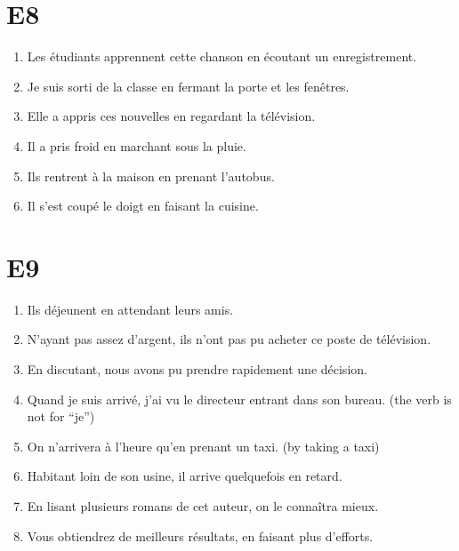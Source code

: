 \documentclass{book}
\begin{document}
    \section{E8}
        \begin{enumerate}
            \item Les étudiants apprennent cette chanson en écoutant un enregistrement.
            \item Je suis sorti de la classe en fermant la porte et les fenêtres.
            \item Elle a appris ces nouvelles en regardant la télévision.
            \item Il a pris froid en marchant sous la pluie.
            \item Ils rentrent à la maison en prenant l'autobus.
            \item Il s'est coupé le doigt en faisant la cuisine.
        \end{enumerate}

    \section{E9}
        \begin{enumerate}
            \item Ils déjeunent en attendant leurs amis.
            \item N'ayant pas assez d'argent, ils n'ont pas pu acheter ce poste de télévision.
            \item En discutant, nous avons pu prendre rapidement une décision.
            \item Quand je suis arrivé, j'ai vu le directeur entrant dans son bureau. (the verb is not for ``je'')
            \item On n'arrivera à l'heure qu'en prenant un taxi. (by taking a taxi)
            \item Habitant loin de son usine, il arrive quelquefois en retard.
            \item En lisant plusieurs romans de cet auteur, on le connaîtra mieux.
            \item Vous obtiendrez de meilleurs résultats, en faisant plus d'efforts.
        \end{enumerate}
\end{document}
